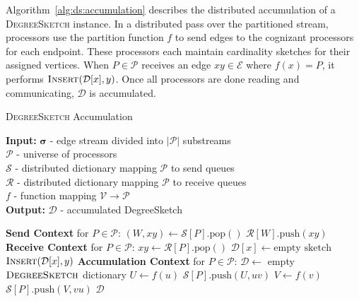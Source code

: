 \documentclass[10]{report}
\newcommand{\push}[1]{\text{push} \left ( #1 \right )}
\newcommand{\pop}{\text{pop}()}
\newcommand{\algoname}[1]{\textnormal{\textsc{#1}}}
\begin{document}
Algorithm~\ref{alg:ds:accumulation} describes the distributed accumulation of a \algoname{DegreeSketch} instance.
In a distributed pass over the partitioned stream, processors use the partition function $f$ to send edges to the cognizant processors for each endpoint. 
These processors each maintain cardinality sketches for their assigned vertices.
When $P \in \mathcal{P}$ receives an edge $xy \in \mathcal{E}$ where $f(x) = P$, it performs $\algoname{Insert}(\mathcal{D}[x], y)$.
Once all processors are done reading and communicating, $\mathcal{D}$ is accumulated.

\begin{algorithm}[htbp] 
\caption{\algoname{DegreeSketch} Accumulation}\label{alg:ds:accumulation}
\begin{flushleft}
        \textbf{Input:} 		$\boldsymbol{\sigma}$ - edge stream divided into $|\mathcal{P}|$ substreams\\
        	\hspace{3.2em}	$\mathcal{P}$ - universe of processors	 \\
        	\hspace{3.2em}	$\mathcal{S}$ - distributed dictionary mapping $\mathcal{P}$ to send queues	 \\
        	\hspace{3.2em}	$\mathcal{R}$ - distributed dictionary mapping $\mathcal{P}$ to receive queues	 \\
        	\hspace{3.2em}	$f$ - function mapping $\mathcal{V} \rightarrow \mathcal{P}$	 \\
        \textbf{Output:} $\mathcal{D}$ - accumulated DegreeSketch
\end{flushleft}
\begin{flushleft}
\begin{algorithmic}[1]
	\Statex \textbf{Send Context} for $P \in \mathcal{P}$:
  			\State $(W, xy) \gets \mathcal{S}[P].\pop$
			\State $\mathcal{R}[W].\push{xy}$
  		\EndWhile
	\Statex \textbf{Receive Context} for $P \in \mathcal{P}$:
  			\State $xy \gets \mathcal{R}[P].\pop$
				\State $\mathcal{D}[x] \gets \text{empty sketch}$
			\EndIf
	  		\State $\algoname{Insert}(\mathcal{D}[x], y)$
  		\EndWhile
	\Statex \textbf{Accumulation Context} for $P \in \mathcal{P}$:
		\State $\mathcal{D} \gets $ empty $\algoname{DegreeSketch}$ dictionary
			\State $U \gets f(u)$
 			\State $\mathcal{S}[P].\push{U, uv}$
			\State $V \gets f(v)$
 			\State $\mathcal{S}[P].\push{V, vu}$
		\EndWhile
		\State \Return $\mathcal{D}$
\end{algorithmic}
\end{flushleft}
\end{algorithm}
\end{document}

